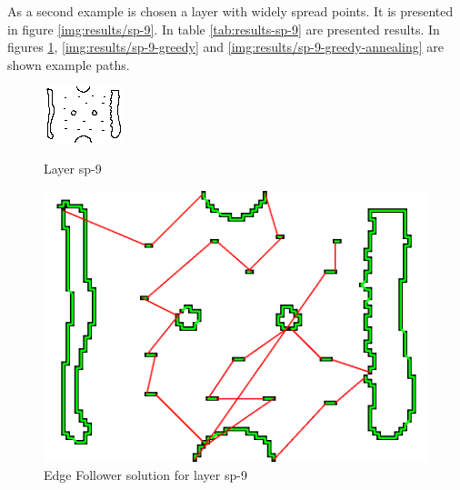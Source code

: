 \documentclass[titlepage]{article}
\newcommand{\multifigcaption}{\captionsetup{justification=justified}}
\begin{document}
As a second example is chosen a layer with widely spread points. It is presented in figure \ref{img:results/sp-9}. In table \ref{tab:results-sp-9} are presented results. In figures \ref{img:results/sp-9-ef}, \ref{img:results/sp-9-greedy} and \ref{img:results/sp-9-greedy-annealing} are shown example paths.

\begin{figure}[H]
	\begin{center}
		\begin{minipage}{.45\linewidth}
			\includegraphics[width=\textwidth]{img/results/sp-9.png}
			\multifigcaption
			\caption{Layer sp-9 \newline}
			\label{img:results/sp-9}
		\end{minipage}
		\hspace{.05\linewidth}
		\begin{minipage}{.45\linewidth}
			\includegraphics[width=\textwidth]{img/results/sp-9-ef-time.png}
			\multifigcaption
			\caption{Edge Follower solution for layer sp-9 }
			\label{img:results/sp-9-ef}
		\end{minipage}	
		
	\end{center}
\end{figure}
\end{document}
